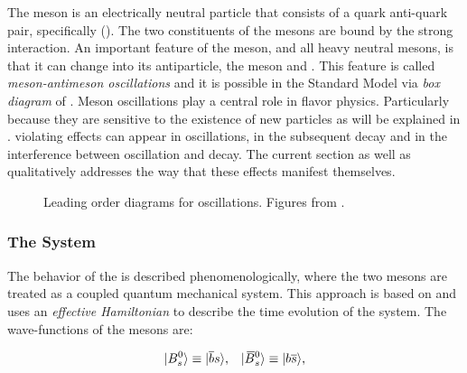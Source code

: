 The \Bs meson is an electrically neutral particle that consists of a quark anti-quark pair, specifically (\bquarkbar\squark).
The two constituents of the mesons are bound by the strong interaction. An important feature of
the \Bs meson, and all heavy neutral mesons, is that it can change into its antiparticle,
the \Bsb meson and \viceversa. This feature is called {\it meson-antimeson oscillations} and it is possible
in the Standard Model via  {\it box diagram} of .
Meson oscillations play a central role in flavor physics. Particularly because they are sensitive to the
existence of new particles as will be explained in . \CP violating effects can
appear in \BBbarSyst oscillations, in the subsequent decay and in the interference between oscillation
and decay. The current section as well as  qualitatively addresses the way that
these effects manifest themselves.

\begin{figure}[!h]
  \centering
  \begin{subfigure}{0.5\textwidth}
    \centering
    \raggedright
    \scalebox{0.9}{\sffamily }
    \caption{}
    \label{bs_box_1}
  \end{subfigure}%
  \hfill%
  \begin{subfigure}{0.5\textwidth}
    \centering
    \raggedleft
    \scalebox{0.9}{\sffamily }
    \caption{}
    \label{bs_box_2}
  \end{subfigure}
  \caption{Leading order diagrams for \BBbarSyst oscillations. Figures from \cite{jeroenThesis}.}
  \label{bs_box}
\end{figure}

\subsubsection{The \BBbarSyst System}
\label{the_bbar_system}

The behavior of the \BBbarSyst is described phenomenologically, where the two mesons are treated as a
coupled quantum mechanical system. This approach
is based on \cite{Weisskopf:1930au,Weisskopf:1930ps} and uses an {\it effective Hamiltonian}
\cite{eff-hamiltonian-bs-syst,DeBruyn-thesis} to describe the time evolution of the system.
The wave-functions of the mesons are:

\begin{equation}
  \centering
  \ket{\Bs}  \equiv  \ket{\bquarkbar\squark}, \;\;\; \ket{\Bsb} \equiv  \ket{\bquark\squarkbar},
  \label{bs_wavefunctions}
\end{equation}

